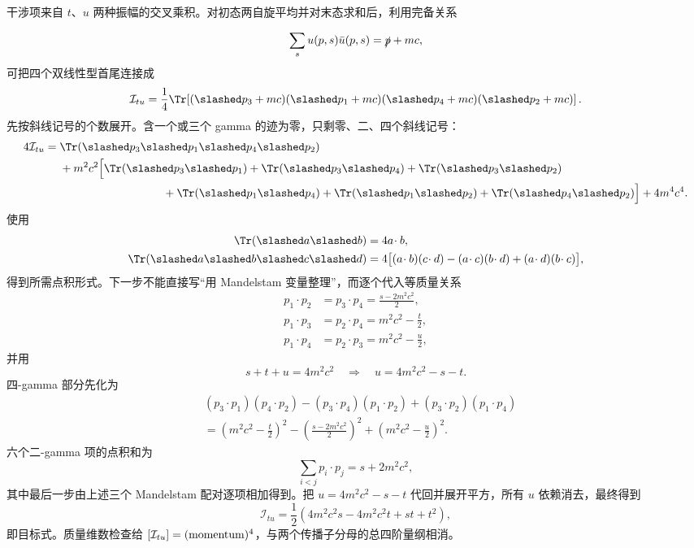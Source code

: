 \begin{derivation}
干涉项来自 $t$、$u$ 两种振幅的交叉乘积。对初态两自旋平均并对末态求和后，利用完备关系

\begin{equation*}
\sum_su(p,s)\bar u(p,s)=\slashed p+mc,
\end{equation*}
可把四个双线性型首尾连接成
\begin{equation*}
\mathcal I_{tu}
=\frac14\Tr\!\left[
(\slashed p_3+mc)(\slashed p_1+mc)
(\slashed p_4+mc)(\slashed p_2+mc)
\right].
\end{equation*}
先按斜线记号的个数展开。含一个或三个 gamma 的迹为零，只剩零、二、四个斜线记号：
\begin{align*}
4\mathcal I_{tu}
={}&\Tr(\slashed p_3\slashed p_1\slashed p_4\slashed p_2)\\
&+m^2c^2\Bigl[
\Tr(\slashed p_3\slashed p_1)
+\Tr(\slashed p_3\slashed p_4)
+\Tr(\slashed p_3\slashed p_2)\\
&\hspace{3.2cm}
+\Tr(\slashed p_1\slashed p_4)
+\Tr(\slashed p_1\slashed p_2)
+\Tr(\slashed p_4\slashed p_2)
\Bigr]
+4m^4c^4.
\end{align*}
使用
\begin{align*}
\Tr(\slashed a\slashed b)&=4a\!\cdot b,\\
\Tr(\slashed a\slashed b\slashed c\slashed d)
&=4\bigl[(a\!\cdot b)(c\!\cdot d)
-(a\!\cdot c)(b\!\cdot d)
+(a\!\cdot d)(b\!\cdot c)\bigr],
\end{align*}
得到所需点积形式。下一步不能直接写“用 Mandelstam 变量整理”，而逐个代入等质量关系
\begin{align*}
p_1\!\cdot p_2&=p_3\!\cdot p_4=\frac{s-2m^2c^2}{2},\\
p_1\!\cdot p_3&=p_2\!\cdot p_4=m^2c^2-\frac t2,\\
p_1\!\cdot p_4&=p_2\!\cdot p_3=m^2c^2-\frac u2,
\end{align*}
并用
\begin{equation*}
s+t+u=4m^2c^2
\quad\Longrightarrow\quad
u=4m^2c^2-s-t.
\end{equation*}
四-gamma 部分先化为
\begin{align*}
&(p_3\!\cdot p_1)(p_4\!\cdot p_2)
-(p_3\!\cdot p_4)(p_1\!\cdot p_2)
+(p_3\!\cdot p_2)(p_1\!\cdot p_4)\\
&=\left(m^2c^2-\frac t2\right)^2
-\left(\frac{s-2m^2c^2}{2}\right)^2
+\left(m^2c^2-\frac u2\right)^2.
\end{align*}
六个二-gamma 项的点积和为
\begin{equation*}
\sum_{i<j}p_i\!\cdot p_j
=s+2m^2c^2,
\end{equation*}
其中最后一步由上述三个 Mandelstam 配对逐项相加得到。把 $u=4m^2c^2-s-t$ 代回并展开平方，所有 $u$ 依赖消去，最终得到
\begin{equation*}
\mathcal I_{tu}
=\frac12\left(4m^2c^2s-4m^2c^2t+st+t^2\right),
\end{equation*}
即目标式。质量维数检查给 $[\mathcal I_{tu}]=({\rm momentum})^4$，与两个传播子分母的总四阶量纲相消。
\end{derivation}





